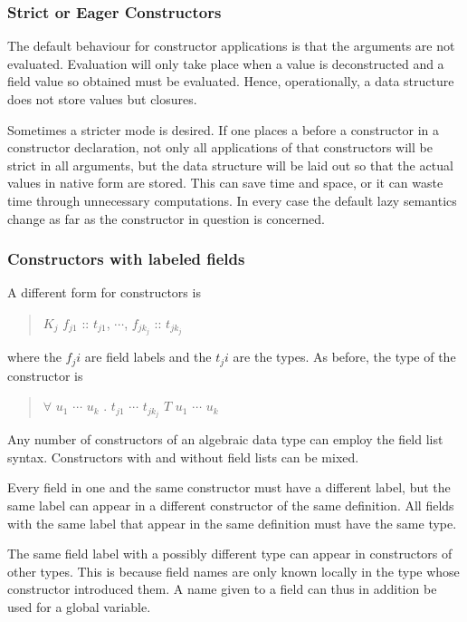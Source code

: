 \subsubsection{Strict or Eager Constructors}

The default behaviour for constructor applications is that the arguments are not evaluated. Evaluation will only take place when a value is deconstructed and a field value so obtained must be evaluated. Hence, operationally, a data structure does not store values but closures.

Sometimes a stricter mode is desired. If one places a \sym{!} before a constructor in a constructor declaration, not only all applications of that constructors will be strict in all arguments, but the data structure will be laid out so that the actual values in native form are stored. This can save time and space, or it can waste time through unnecessary computations. In every case the default lazy semantics change as far as the constructor in question is concerned. 

\subsubsection{Constructors with labeled fields} \label{fieldconstructor}

A different form for constructors is

\begin{quote}
$K_j$ \bracea{} $f_{j1}$ :: $t_{j1}$, $\cdots$, $f_{j{k_j}}$ :: $t_{j{k_j}}$ \bracez{}
\end{quote}

where the $f_ji$ are field labels and the $t_ji$ are the types. 
As before, the type of the constructor is

\begin{quote}
$\forall$ $u_1$ $\cdots$ $u_k$ . $t_{j1}$ \arrow{} $\cdots$ \arrow{} $t_{jk_j}$ \arrow{} $T$ $u_1$ $\cdots$ $u_k$
\end{quote}

Any number of constructors of an algebraic data type can employ the field list syntax. 
Constructors with and without field lists can be mixed.

Every field in one and the same constructor must have a different label, but the same label can appear in a different constructor of the same  definition. 
All fields with the same label that appear in the same  definition must have the same type.

The same field label with a possibly different type can appear in constructors of other types. 
This is because field names are only known locally in the type whose constructor introduced them. 
A name given to a field can thus in addition be used for a global variable.

